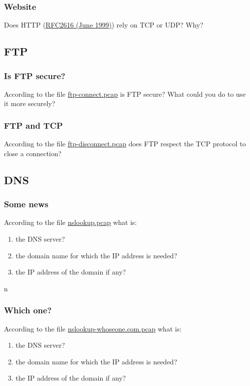 \documentclass[11pt]{article}
\begin{document}
\subsubsection{Website}
Does HTTP (\color{blue}\href{http://tools.ietf.org/html/rfc2616}{RFC2616 (June 1999)}) \color{black} rely on TCP or UDP? Why?

\subsection{FTP}
\subsubsection{Is FTP secure?}
According to the file \color{blue}\href{http://teaching.auzias.net/db/ftp-connect.pcap}{ftp-connect.pcap} \color{black} is FTP secure? What could you do to use it more securely?
\subsubsection{FTP and TCP}
According to the file \color{blue}\href{http://teaching.auzias.net/db/ftp-disconnect.pcap}{ftp-disconnect.pcap} \color{black} does FTP respect the TCP protocol to close a connection?

\subsection{DNS}
\subsubsection{Some news}
According to the file \color{blue}\href{http://teaching.auzias.net/db/nslookup.pcap}{nslookup.pcap} \color{black} what is:
  \begin{enumerate}
    \item the DNS server?
    \item the domain name for which the IP address is needed?
    \item the IP address of the domain if any?
  \end{enumerate}n
\subsubsection{Which one?}
According to the file \color{blue}\href{http://teaching.auzias.net/db/nslookup-whoseone.com.pcap}{nslookup-whoseone.com.pcap} \color{black} what is:
  \begin{enumerate}
    \item the DNS server?
    \item the domain name for which the IP address is needed?
    \item the IP address of the domain if any?
  \end{enumerate}
\end{document}
